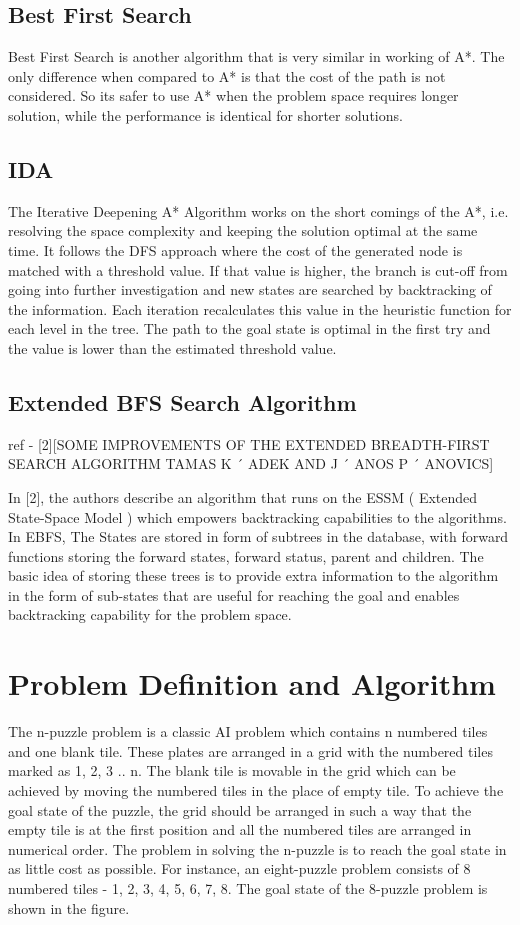 \documentclass{svproc}
\begin{document}
\subsection{Best First Search}
 Best First Search is another algorithm that is very similar in working of A*. The only difference when compared to A* is that the cost of the path is not considered. So its safer to use A* when the problem space requires longer  solution, while the performance is identical for shorter solutions.
\subsection{IDA} 
The Iterative Deepening A* Algorithm works on the short comings of the A*, i.e. resolving the space complexity and keeping the solution optimal at the same time. It follows the DFS approach where the cost of the generated node is matched with a threshold value. If that value is higher, the branch is cut-off from going into further investigation and new states are searched by backtracking of the information. Each iteration recalculates this value in the heuristic function for each level in the tree. The path to the goal state is optimal in the first try and the value is lower than the estimated threshold value.
\subsection{Extended BFS Search Algorithm}

ref - [2][SOME IMPROVEMENTS OF THE EXTENDED BREADTH-FIRST SEARCH ALGORITHM TAMAS K ´ ADEK AND J ´ ANOS P ´ ANOVICS]


In [2], the authors describe an algorithm that runs on the ESSM ( Extended State-Space Model ) which empowers backtracking capabilities to the algorithms. In EBFS, The States are stored in form of subtrees in the database, with forward functions storing the forward states, forward status, parent and children. The basic idea of storing these trees is to provide extra information to the algorithm in the form of sub-states that are useful for reaching the goal and enables backtracking capability for the problem space.


\section{Problem Definition and Algorithm}
The n-puzzle problem is a classic AI problem which contains n numbered tiles and one blank tile. These plates are arranged in a grid with the numbered tiles marked as 1, 2, 3 .. n. The blank tile is movable in the grid which can be achieved by moving the numbered tiles in the place of empty tile. To achieve the goal state of the puzzle, the grid should be arranged in such a way that the empty tile is at the first position and all the numbered tiles are arranged in numerical order. The problem in solving the n-puzzle is to reach the goal state in as little cost as possible. For instance, an eight-puzzle problem consists of 8 numbered tiles - 1, 2, 3, 4, 5, 6, 7, 8. The goal state of the 8-puzzle problem is shown in the figure. \\
\end{document}
